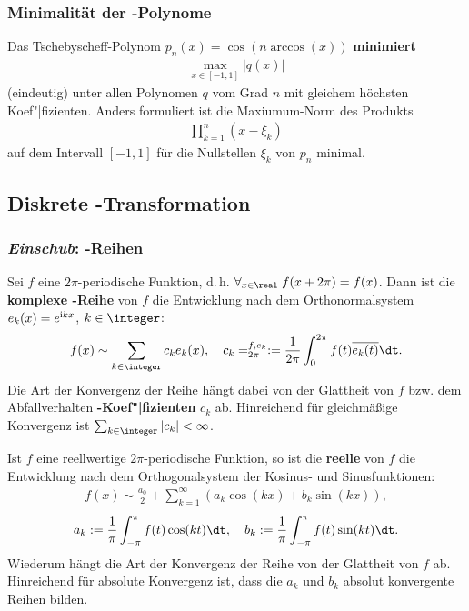 \subsubsection{%
    Minimalität der -Polynome%
}

Das Tschebyscheff-Polynom $p_n(x) = \cos(n \arccos(x))$ \textbf{minimiert}
\begin{align*}
    \max_{x \in [-1,1]} |q(x)|
\end{align*}
(eindeutig) unter allen Polynomen $q$ vom Grad $n$ mit gleichem höchsten
Koef"|fizienten.
Anders formuliert ist die Maxiumum-Norm des Produkts
\begin{align*}
    \prod_{k=1}^n (x - \xi_k)
\end{align*}
auf dem Intervall $[-1,1]$ für die Nullstellen $\xi_k$ von $p_n$ minimal.

\pagebreak

\subsection{%
    Diskrete -Transformation%
}

\setcounter{subsubsection}{-1}

\subsubsection{%
    \emph{Einschub}: -Reihen%
}

Sei $f$ eine $2\pi$-periodische Funktion, d.\,h.
$\forall_{x \in \real}\; f(x + 2\pi) = f(x)$.
Dann ist die \textbf{komplexe -Reihe} von $f$ die Entwicklung
nach dem Orthonormalsystem $e_k(x) = e^{\mathrm{i} kx}$, $k \in \integer$:
\begin{align*}
    f(x) \sim \sum_{k \in \integer} c_k e_k(x), \quad
    c_k = \sp{f, e_k}_{2\pi} :=
    \frac{1}{2\pi} \int_0^{2\pi} f(t) \overline{e_k(t)} \dt.
\end{align*}
Die Art der Konvergenz der Reihe hängt dabei von der Glattheit von $f$ bzw.
dem Abfallverhalten \textbf{-Koef"|fizienten} $c_k$ ab.
Hinreichend für gleichmäßige Konvergenz ist
$\sum_{k \in \integer} |c_k| < \infty$.

\linie

Ist $f$ eine reellwertige $2\pi$-periodische Funktion, so ist die
\textbf{reelle } von $f$ die Entwicklung nach dem
Orthogonalsystem der Kosinus- und Sinusfunktionen:
\begin{align*}
    f(x) \sim \frac{a_0}{2} + \sum_{k=1}^\infty (a_k \cos(kx) + b_k \sin(kx)),
\end{align*}
\begin{align*}
    a_k := \frac{1}{\pi} \int_{-\pi}^\pi f(t) \cos(kt) \dt, \quad
    b_k := \frac{1}{\pi} \int_{-\pi}^\pi f(t) \sin(kt) \dt.
\end{align*}
Wiederum hängt die Art der Konvergenz der Reihe von der Glattheit von $f$ ab.
Hinreichend für absolute Konvergenz ist, dass die
 $a_k$ und $b_k$ absolut konvergente
Reihen bilden.

